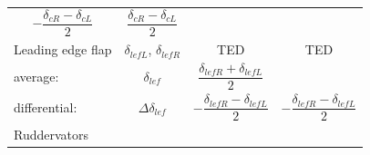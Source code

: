\documentclass[
]{book}
\begin{document}
\begin{longtable}[]{@{}lccc@{}}
\begin{minipage}[t]{0.29\columnwidth}
\[-\frac{\delta_{cR} - \delta_{cL}}{2}\]\strut
\end{minipage} & \begin{minipage}[t]{0.27\columnwidth}\centering
\[\frac{\delta_{cR} - \delta_{cL}}{2}\]\strut
\end{minipage}\tabularnewline
\begin{minipage}[t]{0.19\columnwidth}\raggedright
Leading edge flap\strut
\end{minipage} & \begin{minipage}[t]{0.14\columnwidth}\centering
\(\delta_{lefL}\),
\(\delta_{lefR}\)\strut
\end{minipage} & \begin{minipage}[t]{0.29\columnwidth}\centering
TED\strut
\end{minipage} & \begin{minipage}[t]{0.27\columnwidth}\centering
TED\strut
\end{minipage}\tabularnewline
\begin{minipage}[t]{0.19\columnwidth}\raggedright
average:\strut
\end{minipage} & \begin{minipage}[t]{0.14\columnwidth}\centering
\(\delta_{lef}\)\strut
\end{minipage} & \begin{minipage}[t]{0.29\columnwidth}\centering
\[\frac{\delta_{lefR}+\delta_{lefL}}{2}\]\strut
\end{minipage} & \begin{minipage}[t]{0.27\columnwidth}\centering
\strut
\end{minipage}\tabularnewline
\begin{minipage}[t]{0.19\columnwidth}\raggedright
differential:\strut
\end{minipage} & \begin{minipage}[t]{0.14\columnwidth}\centering
\(\Delta\delta_{lef}\)\strut
\end{minipage} & \begin{minipage}[t]{0.29\columnwidth}\centering
\[-\frac{\delta_{lefR} - \delta_{lefL}}{2}\]\strut
\end{minipage} & \begin{minipage}[t]{0.27\columnwidth}\centering
\[-\frac{\delta_{lefR} - \delta_{lefL}}{2}\]\strut
\end{minipage}\tabularnewline
\begin{minipage}[t]{0.19\columnwidth}\raggedright
Ruddervators\strut
\end{minipage} & \begin{minipage}[t]{0.14\columnwidth}\centering

\end{minipage}
\end{longtable}
\end{document}
